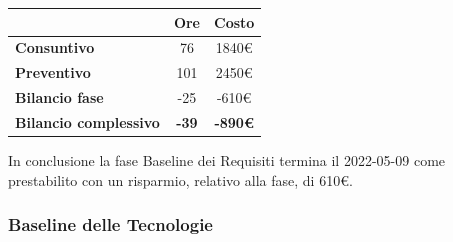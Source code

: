 \begin{center}
	\renewcommand{\arraystretch}{1.8}
	\begin{tabular}{ | l |c|c| }
    \hline
    & \textbf{Ore} & \textbf{Costo} \\
	\hline
    \textbf{Consuntivo} & 76 & 1840\euro \\
    \hline
    \textbf{Preventivo} & 101 & 2450\euro \\
    \hline
    \textbf{Bilancio fase} & -25 & -610\euro \\
    \hline
    \textbf{Bilancio complessivo} & \textbf{-39} & \textbf{-890\euro} \\
    \hline
    \end{tabular}
\end{center}
In conclusione la fase Baseline dei Requisiti termina il 2022-05-09 come prestabilito con un risparmio, relativo
alla fase, di 610€.

\subsubsection{Baseline delle Tecnologie}
